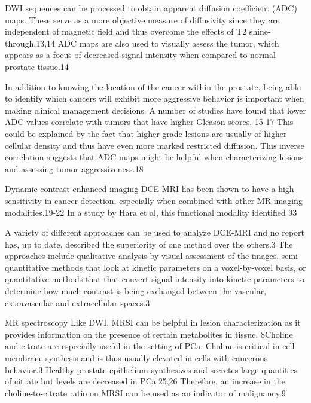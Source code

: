 DWI sequences can be processed to obtain apparent diffusion coefficient (ADC) maps. These serve as a more objective measure of diffusivity since they are independent of magnetic field and thus overcome the effects of T2 shine-through.13,14  ADC maps are also used to visually assess the tumor, which appears as a focus of decreased signal intensity when compared to normal prostate tissue.14 

In addition to knowing the location of the cancer within the prostate, being able to identify which cancers will exhibit more aggressive behavior is important when making clinical management decisions. A number of studies have found that lower ADC values correlate with tumors that have higher Gleason scores. 15-17 This could be explained by the fact that higher-grade lesions are usually of higher cellular density and thus have even more marked restricted diffusion. This inverse correlation suggests that ADC maps might be helpful when characterizing lesions and assessing tumor aggressiveness.18 

Dynamic contrast enhanced imaging
DCE-MRI has been shown to have a high sensitivity in cancer detection, especially when combined with other MR imaging modalities.19-22 In a study by Hara et al, this functional modality identified 93%

A variety of different approaches can be used to analyze DCE-MRI and no report has, up to date, described the superiority of one method over the others.3 The approaches include qualitative analysis by visual assessment of the images, semi-quantitative methods that look at kinetic parameters on a voxel-by-voxel basis, or quantitative methods that that convert signal intensity into kinetic parameters to determine how much contrast is being exchanged between the vascular, extravascular and extracellular spaces.3
	
MR spectroscopy
Like DWI, MRSI can be helpful in lesion characterization as it provides information on the presence of certain metabolites in tissue. 8Choline and citrate are especially useful in the setting of PCa. Choline is critical in cell membrane synthesis and is thus usually elevated in cells with cancerous behavior.3 Healthy prostate epithelium synthesizes and secretes large quantities of citrate but levels are decreased in PCa.25,26 Therefore, an increase in the choline-to-citrate ratio on MRSI can be used as an indicator of malignancy.9 

